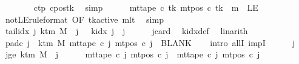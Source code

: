 \begin{isabellebody}
\ \ \ \ \ \ \isamarkupfalse%
\ c{\isacharunderscore}{\kern0pt}tp\ c{\isacharunderscore}{\kern0pt}pos{\isacharunderscore}{\kern0pt}tk\ \isamarkupfalse%
\ simp\isanewline
\ \ \ \ \isamarkupfalse%
\ {\isachardoublequoteopen}mt{\isacharunderscore}{\kern0pt}tape\ c\ {\isacharquery}{\kern0pt}tk\ {\isacharparenleft}{\kern0pt}mt{\isacharunderscore}{\kern0pt}pos\ c\ {\isacharquery}{\kern0pt}tk\ {\isacharminus}{\kern0pt}\ m{\isacharparenright}{\kern0pt}\ {\isasymnoteq}\ LE{}{\isachardoublequoteclose}\isanewline
\ \ \ \ \ \ \isamarkupfalse%
\ notLE{\isacharbrackleft}{\kern0pt}rule{\isacharunderscore}{\kern0pt}format{\isacharcomma}{\kern0pt}\ OF\ tk{\isacharunderscore}{\kern0pt}active\ mlt{\isacharbrackright}{\kern0pt}\ \isamarkupfalse%
\ simp\isanewline
\ \ \isamarkupfalse%
\isanewline
\ \ \isamarkupfalse%
\ tail{\isacharunderscore}{\kern0pt}idx{\isacharcolon}{\kern0pt}\ {\isachardoublequoteopen}{\isasymAnd}j{\isacharprime}{\kern0pt}{\isachardot}{\kern0pt}\ k{\isacharunderscore}{\kern0pt}tm\ M\ {\isasymle}\ j{\isacharprime}{\kern0pt}\ {\isasymLongrightarrow}\ {\isasymnot}\ k{\isacharunderscore}{\kern0pt}idx\ j{\isacharprime}{\kern0pt}\ {\isacharless}{\kern0pt}\ j{\isachardoublequoteclose}\isanewline
\ \ \ \ \isamarkupfalse%
\ jcard\ \isamarkupfalse%
\ k{\isacharunderscore}{\kern0pt}idx{\isacharunderscore}{\kern0pt}def\ \isamarkupfalse%
\ linarith\isanewline
\ \ \isamarkupfalse%
\ pad{\isacharunderscore}{\kern0pt}c{\isacharcolon}{\kern0pt}\ {\isachardoublequoteopen}{\isasymforall}j{\isacharprime}{\kern0pt}\ {\isasymge}\ k{\isacharunderscore}{\kern0pt}tm\ M{\isachardot}{\kern0pt}\ mt{\isacharunderscore}{\kern0pt}tape\ c\ j{\isacharprime}{\kern0pt}\ {\isacharparenleft}{\kern0pt}mt{\isacharunderscore}{\kern0pt}pos\ c\ j{\isacharprime}{\kern0pt}{\isacharparenright}{\kern0pt}\ {\isacharequal}{\kern0pt}\ BLANK{}{\isachardoublequoteclose}\isanewline
\ \ \isamarkupfalse%
\ {\isacharparenleft}{\kern0pt}intro\ allI\ impI{\isacharparenright}{\kern0pt}\isanewline
\ \ \ \ \isamarkupfalse%
\ j{\isacharprime}{\kern0pt}\ \isamarkupfalse%
\ jge{\isacharcolon}{\kern0pt}\ {\isachardoublequoteopen}k{\isacharunderscore}{\kern0pt}tm\ M\ {\isasymle}\ j{\isacharprime}{\kern0pt}{\isachardoublequoteclose}\isanewline
\ \ \ \ \isamarkupfalse%
\ {\isachardoublequoteopen}mt{\isacharunderscore}{\kern0pt}tape\ c\ j{\isacharprime}{\kern0pt}\ {\isacharparenleft}{\kern0pt}mt{\isacharunderscore}{\kern0pt}pos\ c\ j{\isacharprime}{\kern0pt}{\isacharparenright}{\kern0pt}\ {\isacharequal}{\kern0pt}\ mt{\isacharunderscore}{\kern0pt}tape\ c{}\ j{\isacharprime}{\kern0pt}\ {\isacharparenleft}{\kern0pt}mt{\isacharunderscore}{\kern0pt}pos\ c{}\ j{\isacharprime}{\kern0pt}{\isacharparenright}{\kern0pt}{\isachardoublequoteclose}\isanewline

\end{isabellebody}
